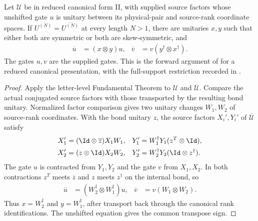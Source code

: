 \begin{lemma}
    \label{lem:mpu_source_local_conjugation_forward}
    \leanok
    Let $\mathcal U$ be in reduced canonical form II, with supplied source
    factors whose unshifted gate $u$ is unitary between its physical-pair and
    source-rank coordinate spaces. If
    $U^{(N)}=\overline{U^{(N)}}$ at every length $N>1$, there are unitaries
    $x,y$ such that either both are symmetric or both are skew-symmetric, and
    \begin{align}
        \overline u & =(x\otimes y)u,                 &
        \overline v & =v(y^\dagger\otimes x^\dagger).
    \end{align}
    The gates $u,v$ are the supplied gates. This is the forward argument of
    \cite[Proposition~V.1, lines~1030--1038]{Cirac2017MPU} for a reduced
    canonical presentation, with the full-support restriction recorded in
    \cite{gap:mpu_canonical_form_full_support}.
\end{lemma}

\begin{proof}
    \leanok
    Apply the letter-level Fundamental Theorem to $\mathcal U$ and
    $\overline{\mathcal U}$. Compare the actual conjugated source factors
    with those transported by the resulting bond unitary. Normalized factor
    comparison gives two unitary changes $W_1,W_2$ of source-rank
    coordinates. With the bond unitary $z$, the source factors $X_i',Y_i'$
    of $\overline{\mathcal U}$ satisfy
    \begin{align}
        X_1' & =(\Id\otimes\overline z)X_1W_1,         &
        Y_1' & =W_1^\dagger Y_1(z^T\otimes\Id),          \\
        X_2' & =(z\otimes\Id)X_2W_2,                   &
        Y_2' & =W_2^\dagger Y_2(\Id\otimes z^\dagger).
    \end{align}
    The gate $u$ is contracted from $Y_1,Y_2$ and the gate $v$ from
    $X_1,X_2$. In both contractions $z^T$ meets $\overline z$ and $z$ meets
    $z^\dagger$ on the internal bond, so
    \begin{align}
        \overline u & =(W_2^\dagger\otimes W_1^\dagger)u, &
        \overline v & =v(W_1\otimes W_2).
    \end{align}
    Thus $x=W_2^\dagger$ and $y=W_1^\dagger$, after transport back through
    the canonical rank identifications. The unshifted equation gives the
    common transpose sign.
\end{proof}

